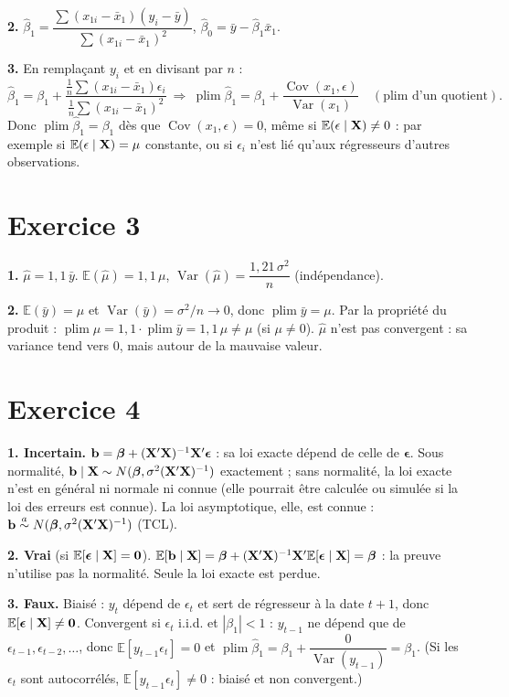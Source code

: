 \documentclass[11pt,a4paper]{article}
\newcommand{\vbeta}{\bm{\beta}}\newcommand{\veps}{\bm{\epsilon}}\newcommand{\Q}{\mathbf{Q}}
\newcommand{\E}{\mathbb{E}}\newcommand{\Var}{\operatorname{Var}}\newcommand{\Cov}{\operatorname{Cov}}
\newcommand{\plim}{\operatorname{plim}}
\begin{document}
\textbf{2.} $\hat\beta_1=\dfrac{\sum(x_{1i}-\bar x_1)(y_i-\bar y)}{\sum(x_{1i}-\bar x_1)^2}$, \quad $\hat\beta_0=\bar y-\hat\beta_1\bar x_1$.

\textbf{3.} En remplaçant $y_i$ et en divisant par $n$ :
\[
\hat\beta_1=\beta_1+\frac{\frac1n\sum(x_{1i}-\bar x_1)\epsilon_i}{\frac1n\sum(x_{1i}-\bar x_1)^2}
\ \Longrightarrow\
\plim\hat\beta_1=\beta_1+\frac{\Cov(x_1,\epsilon)}{\Var(x_1)}\quad(\text{plim d'un quotient}).
\]
Donc $\plim\hat\beta_1=\beta_1$ dès que $\Cov(x_1,\epsilon)=0$, même si $\E(\epsilon\mid\vX)\neq0$ : par exemple si $\E(\epsilon\mid\vX)=\mu$ constante, ou si $\epsilon_i$ n'est lié qu'aux régresseurs d'autres observations.

\section*{Exercice 3}

\textbf{1.} $\hat\mu=1{,}1\,\bar y$. \quad $\E(\hat\mu)=1{,}1\,\mu$, \quad $\Var(\hat\mu)=\dfrac{1{,}21\,\sigma^2}{n}$ (indépendance).

\textbf{2.} $\E(\bar y)=\mu$ et $\Var(\bar y)=\sigma^2/n\to0$, donc $\plim\bar y=\mu$. Par la propriété du produit : $\plim\hat\mu=1{,}1\cdot\plim\bar y=1{,}1\,\mu\neq\mu$ (si $\mu\neq0$). $\hat\mu$ n'est pas convergent : sa variance tend vers 0, mais autour de la mauvaise valeur.

\section*{Exercice 4}

\textbf{1. Incertain.} $\vb=\vbeta+(\vX'\vX)^{-1}\vX'\veps$ : sa loi exacte dépend de celle de $\veps$. Sous normalité, $\vb\mid\vX\sim N(\vbeta,\sigma^2(\vX'\vX)^{-1})$ exactement ; sans normalité, la loi exacte n'est en général ni normale ni connue (elle pourrait être calculée ou simulée si la loi des erreurs est connue). La loi asymptotique, elle, est connue : $\vb\overset{a}{\sim}N(\vbeta,\sigma^2(\vX'\vX)^{-1})$ (TCL).

\textbf{2. Vrai} (si $\E[\veps\mid\vX]=\mathbf 0$). $\E[\vb\mid\vX]=\vbeta+(\vX'\vX)^{-1}\vX'\E[\veps\mid\vX]=\vbeta$ : la preuve n'utilise pas la normalité. Seule la loi exacte est perdue.

\textbf{3. Faux.} Biaisé : $y_t$ dépend de $\epsilon_t$ et sert de régresseur à la date $t+1$, donc $\E[\veps\mid\vX]\neq\mathbf 0$. Convergent si $\epsilon_t$ i.i.d. et $|\beta_1|<1$ : $y_{t-1}$ ne dépend que de $\epsilon_{t-1},\epsilon_{t-2},\dots$, donc $\E[y_{t-1}\epsilon_t]=0$ et $\plim\hat\beta_1=\beta_1+\dfrac{0}{\Var(y_{t-1})}=\beta_1$. (Si les $\epsilon_t$ sont autocorrélés, $\E[y_{t-1}\epsilon_t]\neq0$ : biaisé et non convergent.)
\end{document}
